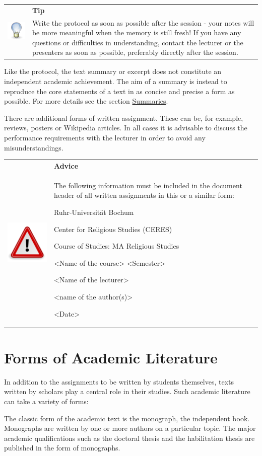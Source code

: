 \documentclass[
  english,
]{scrreprt}
\newlength{\iconwidth}
\newenvironment{displaybox}[2]{%
    \begin{center}
        \setlength\arrayrulewidth{0.75pt}%
        \arrayrulecolor{white}%
        \renewcommand{\arraystretch}{1.3}%
        \begin{tabular}{p{\iconwidth}p{\linewidth-4\tabcolsep-\iconwidth}}
            \multirow{2}{*}{#2}&\cellcolor{boxheadcol}\textbf{\sffamily\color{white}#1} \\%
            \hhline{~-}%
            &\cellcolor{boxcol}%
}{%
            \\
        \end{tabular}
        \arrayrulecolor{black}
    \end{center}
}
\newenvironment{Tip}{%
\begin{displaybox}{Tip}{\includegraphics[width=\iconwidth]{images/icon-tipp}}}%
{\end{displaybox}}
\newenvironment{Advice}{%
\begin{displaybox}{Advice}{\includegraphics[width=\iconwidth]{images/icon-hinweis}}}%
{\end{displaybox}}
\begin{document}
\begin{Tip}

Write the protocol as soon as possible after the session - your notes will be more meaningful when the memory is still fresh! If you have any questions or difficulties in understanding, contact the lecturer or the presenters as soon as possible, preferably directly after the session.

\end{Tip}

Like the protocol, the text summary or excerpt does not constitute an independent academic achievement. The aim of a summary is instead to reproduce the core statements of a text in as concise and precise a form as possible. For more details see the section \hyperref[sec:summaries]{Summaries}.

There are additional forms of written assignment. These can be, for example, reviews, posters or Wikipedia articles. In all cases it is advisable to discuss the performance requirements with the lecturer in order to avoid any misunderstandings.

\begin{Advice}

The following information must be included in the document header of all written assignments in this or a similar form:

Ruhr-Universität Bochum

Center for Religious Studies (CERES)

Course of Studies: MA Religious Studies

\textless Name of the course\textgreater{} \textless Semester\textgreater{}

\textless Name of the lecturer\textgreater{}

\textless name of the author(s)\textgreater{}

\textless Date\textgreater{}

\end{Advice}

\section{Forms of Academic Literature}\label{sec:forms}

In addition to the assignments to be written by students themselves, texts written by scholars play a central role in their studies. Such academic literature can take a variety of forms:

The classic form of the academic text is the monograph, the independent book. Monographs are written by one or more authors on a particular topic. The major academic qualifications such as the doctoral thesis and the habilitation thesis are published in the form of monographs.
\end{document}
